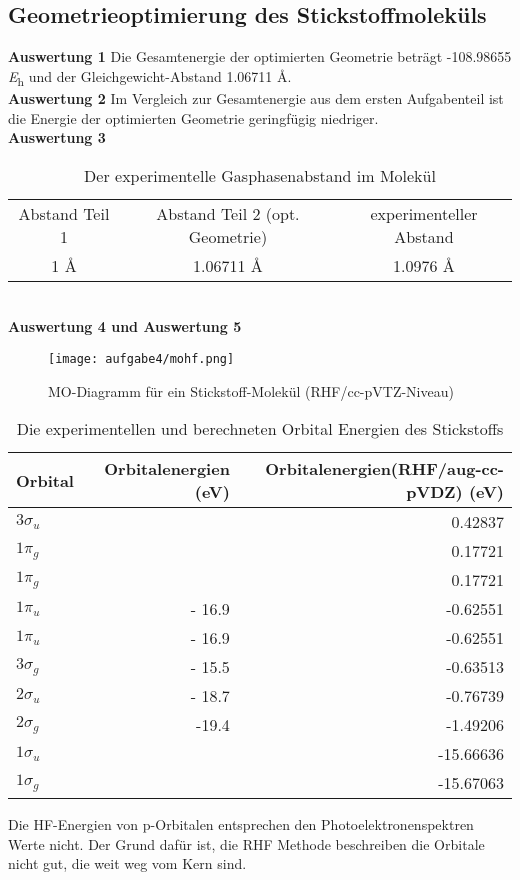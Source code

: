 \documentclass[12pt]{article}
\begin{document}
\begin{onehalfspace}
\subsection{Geometrieoptimierung des Stickstoffmoleküls}
\textbf{Auswertung 1} 
Die Gesamtenergie der optimierten Geometrie beträgt -108.98655 \si{\hartree} und der Gleichgewicht-Abstand 1.06711 \si{\angstrom}.\\
\textbf{Auswertung 2}  
Im Vergleich zur Gesamtenergie aus dem ersten Aufgabenteil ist die Energie der optimierten Geometrie geringfügig niedriger.\\
\textbf{Auswertung 3}\\
\begin{table}[!htpb]
\centering
\caption{Der experimentelle Gasphasenabstand im  Molekül \cite{wiberg653}}
\begin{tabular}{ccc}
\toprule
Abstand Teil 1 & Abstand Teil 2 (opt. Geometrie)  & experimenteller Abstand \\
1 \si{\angstrom} & 1.06711 \si{\angstrom} & 1.0976 \si{\angstrom} \\
\midrule
\bottomrule
\end{tabular}
\end{table}\\
\noindent
\textbf{Auswertung 4 und Auswertung 5}\\ 
\begin{figure}[!htpb]
   \centering
\texttt{[image: aufgabe4/mohf.png]}
\caption{MO-Diagramm für ein Stickstoff-Molekül (RHF/cc-pVTZ-Niveau)}
\end{figure}

\begin{table}[!htpb]
\centering
\caption{Die experimentellen und berechneten Orbital Energien des Stickstoffs}
\begin{tabular}{lrr}
\toprule
Orbital & Orbitalenergien \cite{miessler} (eV) & Orbitalenergien(RHF/aug-cc-pVDZ) (eV)\\
\midrule
$3\sigma _u$ & &    0.42837\\
$1\pi _g$    & &    0.17721 \\
$1\pi _g$    & &    0.17721 \\    
$1\pi _u$    & - 16.9 &  -0.62551 \\    
$1\pi _u$    & - 16.9 & -0.62551 \\    
$3\sigma _g$ &  - 15.5 & -0.63513 \\    
$2\sigma _u$ & - 18.7 & -0.76739 \\    
$2\sigma _g$ & -19.4  & -1.49206 \\   
$1\sigma _u$ &  &-15.66636 \\    
$1\sigma _g$ & &-15.67063 \\    
\bottomrule
\end{tabular}
\end{table}
 Die HF-Energien von p-Orbitalen entsprechen den Photoelektronenspektren Werte \cite{miessler} nicht. 
 Der Grund dafür ist, die RHF Methode beschreiben die Orbitale nicht gut, die weit weg vom Kern sind. 


\end{onehalfspace}
\end{document}
